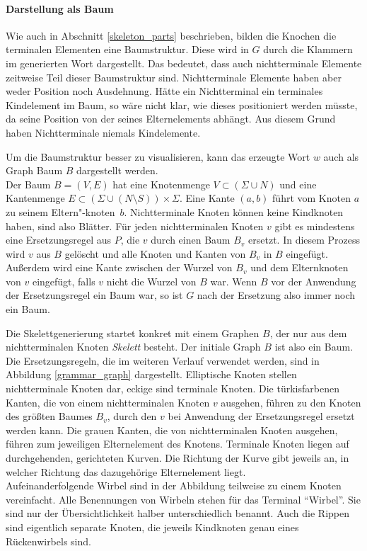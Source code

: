 \paragraph{Darstellung als Baum}
Wie auch in Abschnitt \ref{skeleton_parts} beschrieben, bilden die Knochen \bzw die terminalen Elementen eine Baumstruktur. Diese wird in $G$ durch die Klammern im generierten Wort dargestellt. Das bedeutet, dass auch nichtterminale Elemente zeitweise Teil dieser Baumstruktur sind.
Nichtterminale Elemente haben aber weder Position noch Ausdehnung.
Hätte ein Nichtterminal ein terminales Kindelement im Baum, so wäre nicht klar, wie dieses positioniert werden müsste, da seine Position von der seines Elternelements abhängt.
Aus diesem Grund haben Nichtterminale niemals Kindelemente.

Um die Baumstruktur besser zu visualisieren, kann das erzeugte Wort $w$ auch als Graph \bzw Baum $B$ dargestellt werden.\\
Der Baum $B = (V, E)$ hat eine Knotenmenge $V \subset (\Sigma \cup N)$ und eine Kantenmenge $E \subset (\Sigma \cup (N \setminus S)) \times \Sigma$. Eine Kante $(a, b)$ führt vom Knoten $a$ zu seinem Eltern"-\mbox{knoten $b$}. Nichtterminale Knoten können keine Kindknoten haben, sind also Blätter. Für jeden nichtterminalen Knoten $v$ gibt es mindestens eine Ersetzungsregel aus $P$, die $v$ durch einen Baum $B_v$ ersetzt. In diesem Prozess wird $v$ aus $B$ gelöscht und alle Knoten und Kanten von $B_v$ in $B$ eingefügt. Außerdem wird eine Kante zwischen der Wurzel von $B_v$ und dem Elternknoten von $v$ eingefügt, falls $v$ nicht die Wurzel von $B$ war. Wenn $B$ vor der Anwendung der Ersetzungsregel ein Baum war, so ist $G$ nach der Ersetzung also immer noch ein Baum.

Die Skelettgenerierung startet konkret mit einem Graphen $B$, der nur aus dem nichtterminalen Knoten \emph{Skelett} besteht. Der initiale Graph $B$ ist also ein Baum.\\
Die Ersetzungsregeln, die im weiteren Verlauf verwendet werden, sind in Abbildung \ref{grammar_graph} dargestellt.
Elliptische Knoten stellen nichtterminale Knoten dar, eckige sind terminale Knoten. Die türkisfarbenen Kanten, die von einem nichtterminalen Knoten $v$ ausgehen, führen zu den Knoten des größten Baumes $B_v$, durch den $v$ bei Anwendung der Ersetzungsregel ersetzt werden kann. Die grauen Kanten, die von nichtterminalen Knoten ausgehen, führen zum jeweiligen Elternelement des Knotens. Terminale Knoten liegen auf durchgehenden, gerichteten Kurven. Die Richtung der Kurve gibt jeweils an, in welcher Richtung das dazugehörige Elternelement liegt.\\
Aufeinanderfolgende Wirbel sind in der Abbildung teilweise zu einem Knoten vereinfacht. Alle Benennungen von Wirbeln stehen für das Terminal "`Wirbel"'. Sie sind nur der Übersichtlichkeit halber unterschiedlich benannt. Auch die Rippen sind eigentlich separate Knoten, die jeweils Kindknoten genau eines Rückenwirbels sind.

